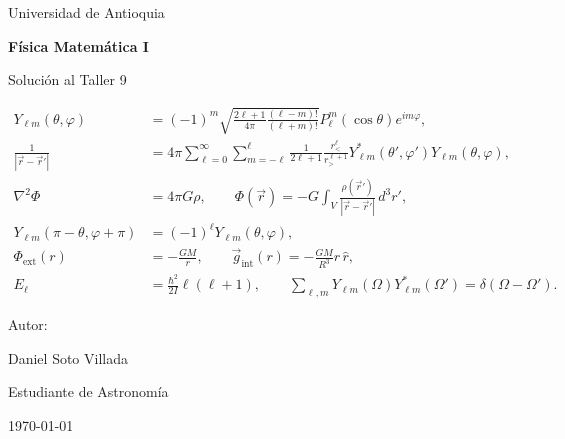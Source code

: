 \documentclass[a4paper]{article}
\begin{document}

\begin{titlepage}
  \centering
  {\Large Universidad de Antioquia\par}
  \vspace{2cm}
  {\huge\bfseries Física Matemática I\par}
  \vspace{0.4cm}
  {\Large Solución al Taller 9 \par}
  \vspace{1.4cm}
  \begin{tcolorbox}[
    width=0.86\textwidth,
    colback=white,
    colframe=black!55,
    arc=2mm,
    boxrule=0.5pt,
    title={\centering Algunas ecuaciones del taller},
    fonttitle=\bfseries
  ]
  \begin{align*}
    Y_{\ell m}(\theta,
    \varphi)
    &= (-1)^m \sqrt{\frac{2\ell+1}{4\pi}\frac{(\ell-m)!}{(\ell+m)!}}
       P_\ell^m(\cos\theta)e^{im\varphi}, \\
    \frac{1}{|\vec r-\vec r'|}
    &= 4\pi \sum_{\ell=0}^{\infty}\sum_{m=-\ell}^{\ell}
       \frac{1}{2\ell+1}\frac{r_<^\ell}{r_>^{\ell+1}}
       Y_{\ell m}^*(\theta',\varphi')Y_{\ell m}(\theta,\varphi), \\
    \nabla^2\Phi &= 4\pi G\rho,
    \qquad
    \Phi(\vec r)=-G\int_V \frac{\rho(\vec r')}{|\vec r-\vec r'|}\,d^3r', \\
    Y_{\ell m}(\pi-\theta,\varphi+\pi)
    &= (-1)^\ell Y_{\ell m}(\theta,\varphi), \\
    \Phi_{\text{ext}}(r) &= -\frac{GM}{r},
    \qquad
    \vec g_{\text{int}}(r)=-\frac{GM}{R^3}r\,\hat r, \\
    E_\ell &= \frac{\hbar^2}{2I}\ell(\ell+1),
    \qquad
    \sum_{\ell,m}Y_{\ell m}(\Omega)Y_{\ell m}^*(\Omega')=\delta(\Omega-\Omega').
  \end{align*}
  \end{tcolorbox}
  \vspace{1.4cm}
  {\large Autor:\par}
  \vspace{0.2cm}
  {\large Daniel Soto Villada\par}
  {\large Estudiante de Astronomía\par}
  \vfill
  {\large \today\par}
\end{titlepage}

\newpage
\tableofcontents
\newpage
\end{document}
